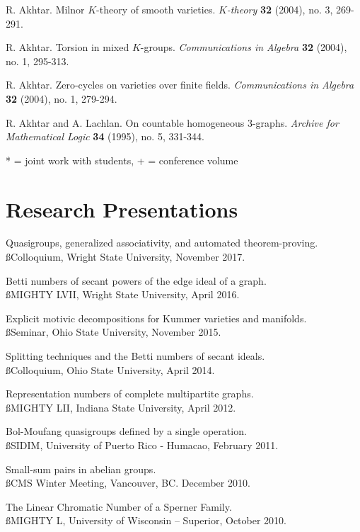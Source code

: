 \documentclass[overlapped,line,letterpaper]{res}
\begin{document}
\begin{resume}
\smallskip
R. Akhtar.  Milnor $K$-theory of smooth varieties. 
 {\em $K$-theory} \textbf{32} (2004), no. 3, 269-291.

\smallskip
R. Akhtar.  Torsion in mixed $K$-groups. 
{\em Communications in Algebra} \textbf{32} (2004), no. 1, 295-313.

\smallskip
R. Akhtar.  Zero-cycles on varieties over finite fields. 
{\em Communications in Algebra} \textbf{32} (2004), no. 1, 279-294. 

\smallskip
R. Akhtar and A. Lachlan.  On countable homogeneous 3-graphs. 
{\em  Archive for Mathematical Logic}  \textbf{34} (1995), no. 5, 331-344.

\medskip

* = joint work with students, + = conference volume 

\large
\section{\bf Research Presentations}
\vspace{3 mm}
\normalsize

\smallskip
Quasigroups, generalized associativity, and automated theorem-proving. \\ {\ss Colloquium, Wright State University, November 2017.}

Betti numbers of secant powers of the edge ideal of a graph.  \\ {\ss MIGHTY LVII, Wright State University, April 2016.}

Explicit motivic decompositions for Kummer varieties and manifolds. \\ {\ss Seminar, Ohio State University, November 2015.}

Splitting techniques and the Betti numbers of secant ideals. \\ {\ss Colloquium, Ohio State University, April 2014.}

Representation numbers of complete multipartite graphs.\\ {\ss MIGHTY LII, Indiana State University, April 2012.}

Bol-Moufang quasigroups defined by a single operation. \\ {\ss SIDIM, University of Puerto Rico - Humacao, February 2011.}

Small-sum pairs in abelian groups.  \\ {\ss CMS Winter Meeting, Vancouver, BC.  December 2010.}

The Linear Chromatic Number of a Sperner Family. \\ {\ss MIGHTY L, University of Wisconsin -- Superior,  October 2010.}


\end{resume}
\end{document}
